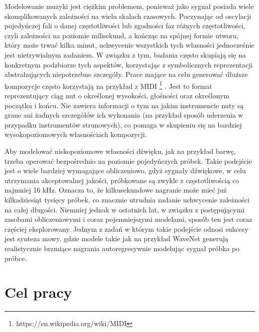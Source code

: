 \documentclass[magisterska]{pracamgr}
\begin{document}
Modelowanie muzyki jest ciężkim problemem, ponieważ jako sygnał posiada wiele skomplikowanych zależności na wielu skalach czasowych. Poczynając od oscylacji pojedyńczej fali o danej częstotliwości lub zgodności faz różnych częstotliwości, czyli zależności na poziomie milisekund, a kończąc na spójnej formie utworu, który może trwać kilka minut, uchwycenie wszystkich tych własności jednocześnie jest nietrywialnym zadaniem. W związku z tym, badania często skupiają się na konkretnym podzbiorze tych aspektów, korzystając z symbolicznych reprezentacji abstrahujących niepotrzebne szczegóły. Prace mające na celu generować dłuższe kompozycje często korzystają na przykład z MIDI \footnote{https://en.wikipedia.org/wiki/MIDI} \cite{huang2018music}. Jest to format reprezentujący ciąg nut o określonej wysokości, głośności oraz określonym początku i końcu. Nie zawiera informacji o tym na jakim instrumencie nuty są grane ani żadnych szczegółów ich wykonania (na przykład sposób uderzenia w przypadku instrumentów strunowych), co pomaga w skupieniu się na bardziej wysokopoziomowych własnościach kompozycji.

Aby modelować niskopoziomowe własności dźwięku, jak na przykład barwę, trzeba operować bezpośrednio na poziomie pojedyńczych próbek. Takie podejście jest o wiele bardziej wymagające obliczeniowo, gdyż sygnały dźwiękowe, w celu utrzymania akceptowalnej jakości, próbkowane są zwykle z częstotliwością co najmniej 16 kHz. Oznacza to, że kilkusekundowe nagranie może mieć już kilkadziesiąt tysięcy próbek, co znacznie utrudnia zadanie uchwycenie zależności na całej długości. Niemniej jednak w ostatnich lat, w związku z postępującymi zasobami obliczeniowymi i coraz pojemniejszymi modelami, sposób ten jest coraz częściej eksplorowany. Jednym z zadań w którym takie podejście odnosi sukcesy jest synteza mowy, gdzie modele takie jak na przykład WaveNet \cite{oord2016wavenet} generują realistycznie brzmiące nagrania autoregresywnie modelując sygnał próbka po próbce.

\section*{Cel pracy}
\end{document}
